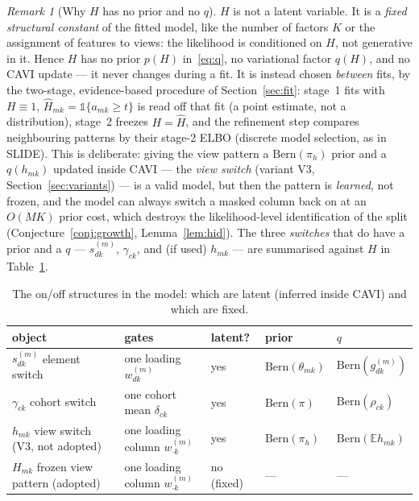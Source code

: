 \documentclass[11pt,a4paper]{article}
\newcommand{\new}[1]{{\color{red}#1}}
\newcommand{\E}{\mathbb{E}}
\newcommand{\Bern}{\mathrm{Bern}}
\theoremstyle{definition}
\theoremstyle{remark}
\newtheorem*{remark}{Remark}
\begin{document}
\begin{remark}[Why $H$ has no prior and no $q$]\label{rem:H}
$H$ is \new{not a latent variable}. It is a \emph{fixed structural constant} of the fitted model, like the number of
factors $K$ or the assignment of features to views: the likelihood is conditioned on $H$, not generative in it. Hence
$H$ has no prior $p(H)$ in~\eqref{eq:q}, no variational factor $q(H)$, and no CAVI update --- it never changes during a
fit. It is instead chosen \emph{between} fits, by the two-stage, evidence-based procedure of Section~\ref{sec:fit}:
stage~1 fits with $H\equiv1$, $\hat H_{mk}=\mathbb 1\{a_{mk}\ge t\}$ is read off that fit (a point estimate, not a
distribution), stage~2 freezes $H=\hat H$, and the refinement step compares neighbouring patterns by their stage-2
ELBO (discrete model selection, as in SLIDE). This is deliberate: giving the view pattern a $\Bern(\pi_h)$ prior and a
$q(h_{mk})$ updated inside CAVI --- the \emph{view switch} (variant V3, Section~\ref{sec:variants}) --- is a valid model,
but then the pattern is \emph{learned}, not frozen, and the model can always switch a masked column back on at an
$O(MK)$ prior cost, which destroys the likelihood-level identification of the split (Conjecture~\ref{conj:growth},
Lemma~\ref{lem:hid}). The three \emph{switches} that do have a prior and a $q$ --- $s^{(m)}_{dk}$, $\gamma_{ck}$, and (if
used) $h_{mk}$ --- are summarised against $H$ in Table~\ref{tab:switches}.
\end{remark}

\begin{table}[h]\centering\footnotesize
\caption{The on/off structures in the model: which are latent (inferred inside CAVI) and which are fixed.}
\label{tab:switches}
\begin{tabular}{@{}lllll@{}}\toprule
object & gates & latent? & prior & $q$\\\midrule
$s^{(m)}_{dk}$ element switch & one loading $w^{(m)}_{dk}$ & yes & $\Bern(\theta_{mk})$ & $\Bern(g^{(m)}_{dk})$\\
$\gamma_{ck}$ cohort switch & one cohort mean $\delta_{ck}$ & yes & $\Bern(\pi)$ & $\Bern(\rho_{ck})$\\
$h_{mk}$ view switch (V3, not adopted) & one loading column $w^{(m)}_{\cdot k}$ & yes & $\Bern(\pi_h)$ & $\Bern(\E h_{mk})$\\
\new{$H_{mk}$ frozen view pattern (adopted)} & \new{one loading column $w^{(m)}_{\cdot k}$} & \new{no (fixed)} & \new{---} & \new{---}\\
\bottomrule\end{tabular}
\end{table}
\end{document}
